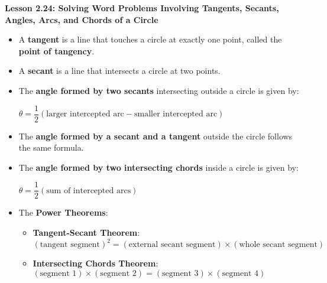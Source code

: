 \begin{center}
\textbf{Lesson 2.24: Solving Word Problems Involving Tangents, Secants, Angles, Arcs, and Chords of a Circle}
\end{center}

\vspace*{-1.5ex}

\begin{itemize}
    \item A \textbf{tangent} is a line that touches a circle at exactly one point, called the \textbf{point of tangency}.
    \item A \textbf{secant} is a line that intersects a circle at two points.
    \item The \textbf{angle formed by two secants} intersecting outside a circle is given by:

{\centering $
    \theta = \dfrac{1}{2} ( \text{larger intercepted arc} - \text{smaller intercepted arc} )
$\par}
    \item The \textbf{angle formed by a secant and a tangent} outside the circle follows the same formula.
    \item The \textbf{angle formed by two intersecting chords} inside a circle is given by:

{\centering $
    \theta = \dfrac{1}{2} ( \text{sum of intercepted arcs} )
$\par}
    \item The \textbf{Power Theorems}:
    \begin{itemize}
        \item \textbf{Tangent-Secant Theorem}: $ ( \text{tangent segment} )^2 = ( \text{external secant segment} ) \times ( \text{whole secant segment} )$
        \item \textbf{Intersecting Chords Theorem}: $ ( \text{segment 1} ) \times ( \text{segment 2} ) = ( \text{segment 3} ) \times ( \text{segment 4} )$
    \end{itemize}
\end{itemize}
